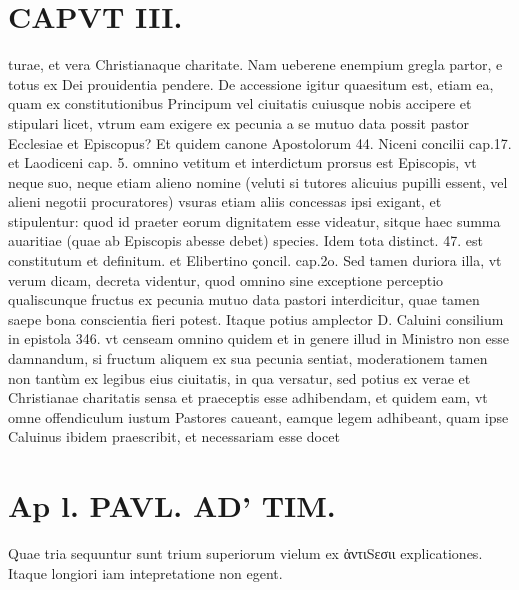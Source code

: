 \documentclass{article}
\begin{document}
\begin{pages}
\section*{CAPVT  III. }
\marginpar{[ p.139 ]}\pstart turae, et vera Christianaque charitate. Nam ueberene enempium gregla partor, e totus ex Dei prouidentia pendere.  \pend\pstart De accessione igitur quaesitum est, etiam ea, quam ex constitutionibus Principum vel ciuitatis cuiusque nobis accipere et stipulari licet, vtrum eam exigere ex pecunia a se mutuo data possit pastor Ecclesiae et Episcopus? Et quidem canone Apostolorum 44. Niceni concilii cap.17. et Laodiceni cap. 5. omnino vetitum et interdictum prorsus est Episcopis, vt neque suo, neque etiam alieno nomine (veluti si tutores alicuius pupilli essent, vel alieni negotii procuratores) vsuras etiam aliis concessas ipsi exigant, et stipulentur: quod id praeter eorum dignitatem esse videatur, sitque haec summa auaritiae (quae ab Episcopis abesse debet) species. Idem tota distinct. 47. est constitutum et definitum. et Elibertino çoncil. cap.2o. Sed tamen duriora illa, vt verum dicam, decreta videntur, quod omnino sine exceptione perceptio qualiscunque fructus ex pecunia mutuo data pastori interdicitur, quae tamen saepe bona conscientia fieri potest. Itaque potius amplector D. Caluini consilium in epistola 346. vt censeam omnino quidem et in genere illud in Ministro non esse damnandum, si fructum aliquem ex sua pecunia sentiat, moderationem tamen non tantùm ex legibus eius ciuitatis, in qua versatur, sed potius ex verae et Christianae charitatis sensa et praeceptis esse adhibendam, et quidem eam, vt omne offendiculum iustum Pastores caueant, eamque legem adhibeant, quam ipse Caluinus ibidem praescribit, et necessariam esse docet  \pend
\section*{Ap l. PAVL. AD' TIM. }
\marginpar{[ p.140 ]}\pstart Quae tria sequuntur sunt trium superiorum vielum ex ἀντιSεσιι explicationes. Itaque longiori iam intepretatione non egent.  \pend
{}
{}

\end{pages}
\end{document}
